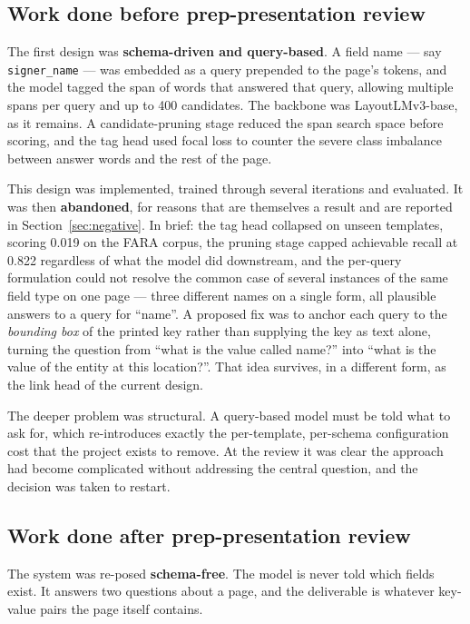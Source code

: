\documentclass[11pt,a4paper]{article}
\newcommand{\code}[1]{\texttt{\small #1}}
\begin{document}
\subsection{Work done before prep-presentation review}
\label{sec:before}

The first design was \textbf{schema-driven and query-based}. A field name --- say
\code{signer\_name} --- was embedded as a query prepended to the page's tokens, and the model
tagged the span of words that answered that query, allowing multiple spans per query and up to
400 candidates. The backbone was LayoutLMv3-base, as it remains. A candidate-pruning stage
reduced the span search space before scoring, and the tag head used focal loss to counter the
severe class imbalance between answer words and the rest of the page.

This design was implemented, trained through several iterations and evaluated. It was then
\textbf{abandoned}, for reasons that are themselves a result and are reported in
Section~\ref{sec:negative}. In brief: the tag head collapsed on unseen templates, scoring 0.019
on the FARA corpus, the pruning stage capped achievable recall at 0.822 regardless of what the
model did downstream, and the per-query formulation could not resolve the common case of several
instances of the same field type on one page --- three different names on a single form, all
plausible answers to a query for ``name''. A proposed fix was to anchor each query to the
\emph{bounding box} of the printed key rather than supplying the key as text alone, turning the
question from ``what is the value called name?'' into ``what is the value of the entity at this
location?''. That idea survives, in a different form, as the link head of the current design.

The deeper problem was structural. A query-based model must be told what to ask for, which
re-introduces exactly the per-template, per-schema configuration cost that the project exists to
remove. At the review it was clear the approach had become complicated without addressing the
central question, and the decision was taken to restart.

\subsection{Work done after prep-presentation review}
\label{sec:after}

The system was re-posed \textbf{schema-free}. The model is never told which fields exist. It
answers two questions about a page, and the deliverable is whatever key-value pairs the page
itself contains.
\end{document}
